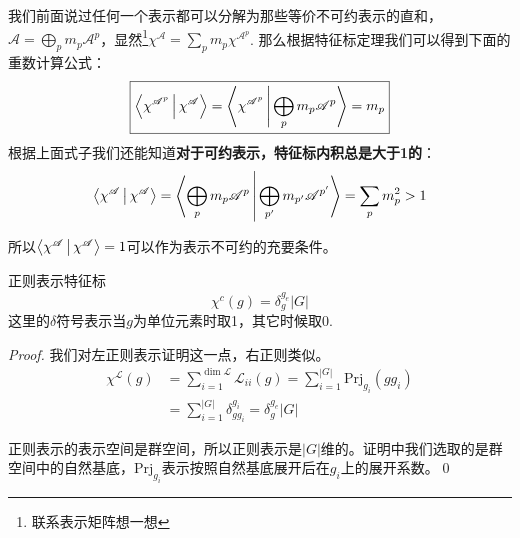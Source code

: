 我们前面说过任何一个表示都可以分解为那些等价不可约表示的直和，$\mathscr{A}=\bigoplus_p m_p\mathscr{A}^p$，显然\footnote{联系表示矩阵想一想}$\chi^\mathscr{A}=\sum_p m_p\chi^{\mathscr{A}^p}$. 那么根据特征标定理我们可以得到下面的重数计算公式：
\begin{equation}
	\boxed{
	\Braket{\chi^{\mathscr{A}^p}|\chi^{\mathscr{A}}}=\Braket{\chi^{\mathscr{A}^p}|\bigoplus_p m_p\mathscr{A}^p}=m_p
}
\end{equation}
根据上面式子我们还能知道\textbf{对于可约表示，特征标内积总是大于1的}：
\begin{equation}
	\Braket{\chi^{\mathscr{A}}|\chi^{\mathscr{A}}}=\Braket{\bigoplus_p m_p\mathscr{A}^p|\bigoplus_{p^\prime} m_{p^\prime}\mathscr{A}^{p^\prime}}=\sum_p m_p^2>1
\end{equation}

所以$\Braket{\chi^{\mathscr{A}}|\chi^{\mathscr{A}}}=1$可以作为表示不可约的充要条件。
\begin{proposition}{正则表示特征标}
	\begin{equation}
		\label{eq:D.23}
		\chi^{c}(g)=\delta_{g}^{g_e}|G|
	\end{equation}
这里的$\delta$符号表示当$g$为单位元素时取1，其它时候取0.
\end{proposition}
\begin{proof}
	我们对左正则表示证明这一点，右正则类似。
	\begin{align*}
		\chi^{\mathscr{L}}(g)&=\sum_{i=1}^{\dim \mathscr{L}}\mathcal{L}_{ii}(g)=\sum_{i=1}^{|G|}\mathrm{Prj}_{g_i}(gg_i)\\
		&=\sum_{i=1}^{|G|}\delta_{gg_i}^{g_i}=\delta_{g}^{g_e}|G|
	\end{align*}

	正则表示的表示空间是群空间，所以正则表示是$|G|$维的。证明中我们选取的是群空间中的自然基底，$\mathrm{Prj}_{g_i}$表示按照自然基底展开后在$g_i$上的展开系数。\qed
\end{proof}

